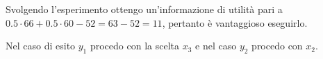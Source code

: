 \documentclass[\main/main.tex]{subfiles}
\begin{document}
\begin{figure}
\end{figure}

Svolgendo l'esperimento ottengo un'informazione di utilità pari a $0.5 \cdot 66 + 0.5 \cdot 60 - 52 = 63 - 52 = 11$, pertanto è vantaggioso eseguirlo.

Nel caso di esito $y_1$ procedo con la scelta $x_3$ e nel caso $y_2$ procedo con $x_2$.
\end{document}
